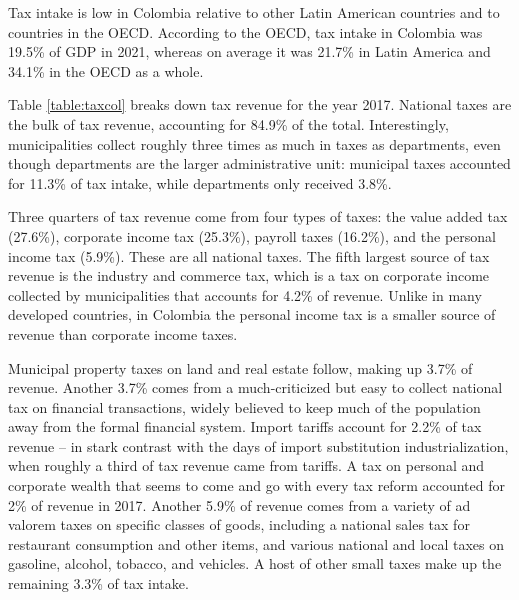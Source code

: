 \documentclass[12pt]{article}
\begin{document}
Tax intake is low in Colombia
relative to other Latin American countries and to countries in the OECD.
According to the OECD\cite{oecd,oecd_latam},
tax intake in Colombia was 19.5\% of GDP in 2021,
whereas on average it was
21.7\% in Latin America and
34.1\% in the OECD as a whole.
\iffalse
    [[ SOMEONE: Put these in the bibliography:
        \label{oecd}:
        Revenue Statistics 2022: The impact of COVID-19 on OECD tax revenues
        https://www.oecd.org/tax/tax-policy/revenue-statistics-highlights-brochure.pdf
        \label{oecd_latam}:
        Revenue Statistics in Latin America and the Caribbean 2023
        https://www.oecd.org/tax/tax-policy/brochure-revenue-statistics-latin-america-and-caribbean.pdf
    ]]

    [[ SOMEONE: The numbers below need updating. That probably just means updating the table they come from and then reading those into these paragraphs.]]
\fi

Table \ref{table:taxcol} breaks down tax revenue for the year 2017.
National taxes are the bulk of tax revenue,
accounting for 84.9\% of the total.
Interestingly, municipalities collect roughly three times as much in taxes as departments,
even though departments are the larger administrative unit:
municipal taxes accounted for 11.3\% of tax intake,
while departments only received 3.8\%.

Three quarters of tax revenue come from four types of taxes:
the value added tax (27.6\%),
corporate income tax (25.3\%),
payroll taxes (16.2\%),
and the personal income tax (5.9\%).
These are all national taxes.
The fifth largest source of tax revenue is the industry and commerce tax,
which is a tax on corporate income collected by municipalities
that accounts for 4.2\% of revenue.
Unlike in many developed countries, in Colombia
the personal income tax is a smaller source of revenue than corporate income taxes.

Municipal property taxes on land and real estate follow,
making up 3.7\% of revenue.
Another 3.7\% comes from a much-criticized but easy to collect national tax on financial transactions,
widely believed to keep much of the population away from the formal financial system.
Import tariffs account for 2.2\% of tax revenue
-- in stark contrast with the days of import substitution industrialization,
when roughly a third of tax revenue came from tariffs.
A tax on personal and corporate wealth
that seems to come and go with every tax reform
accounted for 2\% of revenue in 2017.
Another 5.9\% of revenue comes from a variety of
ad valorem taxes on specific classes of goods,
including a national sales tax for restaurant consumption and other items,
and various national and local taxes on
gasoline, alcohol, tobacco, and vehicles.
A host of other small taxes make up the remaining 3.3\% of tax intake.
\end{document}
